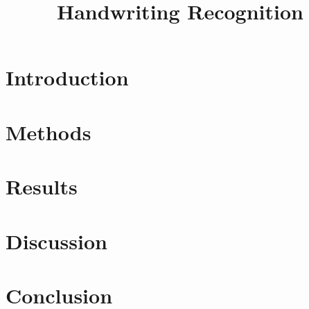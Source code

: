 \documentclass[conference,compsoc]{IEEEtran}
\begin{document}
\title{Handwriting Recognition}
\author{
\and
{}
}

\maketitle



\section{Introduction}
\label{s:introduction}


\section{Methods}
\label{s:methods}


\section{Results}
\label{s:results}


\section{Discussion}
\label{s:discussion}


\section{Conclusion}
\label{s:conclusion}




\end{document}
